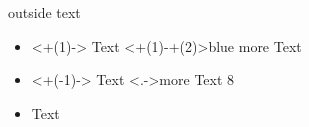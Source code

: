 \documentclass{beamer}
\begin{document}
\begin{frame}

\pause[6]

outside text

\begin{itemize}
\item<+(1)-> Text {\color<+(1)-+(2)>{blue} more Text} 
\item<+(-1)-> Text \visible<.->{more Text 8} 
\item<+-> Text
\end{itemize}

\end{frame}
\end{document}
